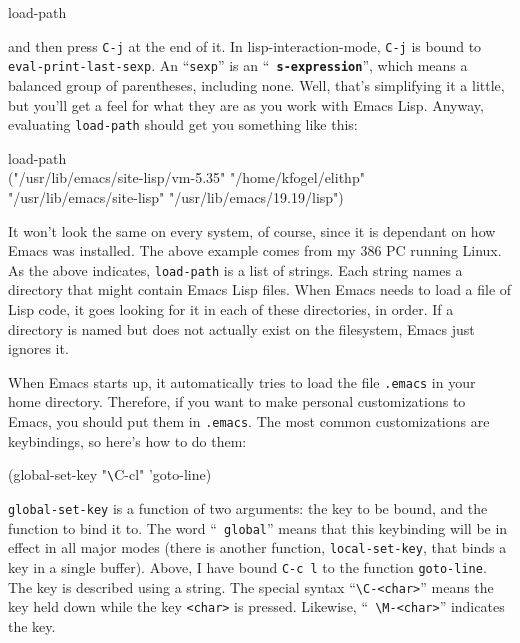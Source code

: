 \begin{screen}
   \begin{tt}
load-path
   \end{tt}
\end{screen}

        and then press {\tt C-j} at the end of it.  In
lisp-interaction-mode, {\tt C-j} is bound to {\tt
eval-print-last-sexp}.  An ``{\tt sexp}'' is an ``{\tt\bf
s-expression}'', which means a balanced group of parentheses,
including none.  Well, that's simplifying it a little, but you'll get
a feel for what they are as you work with Emacs Lisp.  Anyway,
evaluating {\tt load-path} should get you something like this:

\begin{screen}
   \begin{tt}
load-path \\
("/usr/lib/emacs/site-lisp/vm-5.35" "/home/kfogel/elithp" \\
 "/usr/lib/emacs/site-lisp" "/usr/lib/emacs/19.19/lisp")
   \end{tt}
\end{screen}

        It won't look the same on every system, of course, since it is
dependant on how Emacs was installed.  The above example comes from my
386 PC running Linux.  As the above indicates, {\tt load-path} is a
list of strings.  Each string names a directory that might contain
Emacs Lisp files.  When Emacs needs to load a file of Lisp code, it
goes looking for it in each of these directories, in order.  If a
directory is named but does not actually exist on the filesystem,
Emacs just ignores it.

        When Emacs starts up, it automatically tries to load the file
{\tt .emacs} in your home directory.  Therefore, if you want to make
personal customizations to Emacs, you should put them in {\tt .emacs}.
The most common customizations are keybindings, so here's how to do
them:

\begin{screen}
   \begin{tt}
(global-set-key "\verb+\+C-cl" 'goto-line)
   \end{tt}
\end{screen}

        {\tt global-set-key} is a function of two arguments: the key
to be bound, and the function to bind it to.  The word ``{\tt
global}'' means that this keybinding will be in effect in all major
modes (there is another function, {\tt local-set-key}, that binds a
key in a single buffer).  Above, I have bound {\tt C-c~l} to the
function {\tt goto-line}.  The key is described using a string.  The
special syntax ``{\tt \verb+\+C-<char>}'' means the 
key held down while the key {\tt <char>} is pressed.  Likewise, ``{\tt
\verb+\+M-<char>}'' indicates the  key.

